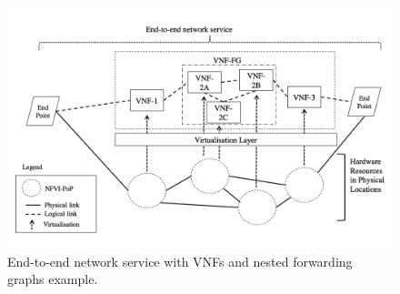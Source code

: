 \begin{figure}[h]
	\centering
	\includegraphics[clip= true, width= \columnwidth, trim=0cm 1cm 1cm 1cm]{images/network_service.png}
	\caption{End-to-end network service with VNFs and nested forwarding graphs example.}
	\label{fig:end2end_network_service}
\end{figure}

